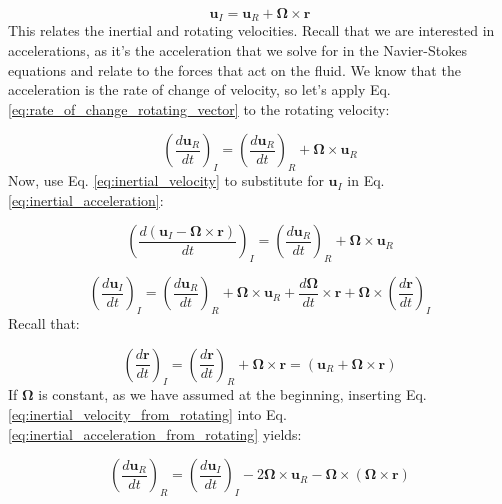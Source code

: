 \documentclass[12pt]{article}
\numberwithin{equation}{section}
\numberwithin{figure}{section}
\numberwithin{table}{section}
\begin{document}
\begin{equation}
  \mathbf{u}_I = \mathbf{u}_R + \mathbf{\Omega} \times \mathbf{r}
  \label{eq:inertial_velocity}
\end{equation}
This relates the inertial and rotating velocities.
Recall that we are interested in accelerations, as it's the acceleration that
we solve for in the Navier-Stokes equations and relate to the forces that act
on the fluid.
We know that the acceleration is the rate of change of velocity, so let's apply
Eq. \ref{eq:rate_of_change_rotating_vector} to the rotating velocity:

\begin{equation}
  \left( \frac{d\mathbf{u}_R}{dt} \right)_I = \left( \frac{d\mathbf{u}_R}{dt} \right)_R + \mathbf{\Omega} \times \mathbf{u}_R
  \label{eq:inertial_acceleration}
\end{equation}
Now, use Eq. \ref{eq:inertial_velocity} to substitute for $\mathbf{u}_I$ in
Eq. \ref{eq:inertial_acceleration}:

\begin{equation}
  \left( \frac{d\left(\mathbf{u}_I - \mathbf{\Omega} \times \mathbf{r}\right)}{dt} \right)_I = 
  \left( \frac{d\mathbf{u}_R}{dt} \right)_R + \mathbf{\Omega} \times \mathbf{u}_R
\end{equation}

\begin{equation}
  \left( \frac{d \mathbf{u}_I}{dt} \right)_I =
  \left( \frac{d \mathbf{u}_R}{dt} \right)_R +
  \mathbf{\Omega} \times \mathbf{u}_R +
  \frac{d\mathbf{\Omega}}{dt} \times \mathbf{r} +
  \mathbf{\Omega} \times \left( \frac{d\mathbf{r}}{dt} \right)_I
  \label{eq:inertial_acceleration_from_rotating}
\end{equation}
Recall that:

\begin{equation}
  \left( \frac{d \mathbf{r}}{dt} \right)_I =
  \left( \frac{d \mathbf{r}}{dt} \right)_R +
  \mathbf{\Omega} \times \mathbf{r} =
  \left( \mathbf{u}_R + \mathbf{\Omega} \times \mathbf{r} \right)
  \label{eq:inertial_velocity_from_rotating}
\end{equation}
If $\mathbf{\Omega}$ is constant, as we have assumed at the beginning,
inserting Eq. \ref{eq:inertial_velocity_from_rotating} into Eq.
\ref{eq:inertial_acceleration_from_rotating} yields:

\begin{equation}
  \left( \frac{d \mathbf{u}_R}{dt} \right)_R =
  \left( \frac{d \mathbf{u}_I}{dt} \right)_I -
  2 \mathbf{\Omega} \times \mathbf{u}_R -
  \mathbf{\Omega} \times \left( \mathbf{\Omega} \times \mathbf{r} \right)
  \label{eq:rotating_acceleration}
\end{equation}
\end{document}
